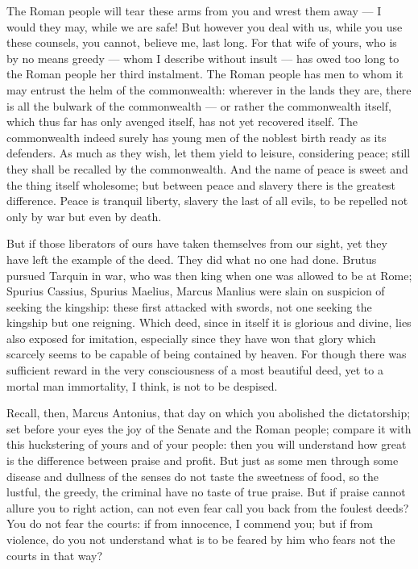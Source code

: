  The Roman people will tear these arms from you and wrest them away --- I would they may, while we are safe! But however you deal with us, while you use these counsels, you cannot, believe me, last long. For that wife of yours, who is by no means greedy --- whom I describe without insult --- has owed too long to the Roman people her third instalment. The Roman people has men to whom it may entrust the helm of the commonwealth: wherever in the lands they are, there is all the bulwark of the commonwealth --- or rather the commonwealth itself, which thus far has only avenged itself, has not yet recovered itself. The commonwealth indeed surely has young men of the noblest birth ready as its defenders. As much as they wish, let them yield to leisure, considering peace; still they shall be recalled by the commonwealth. And the name of peace is sweet and the thing itself wholesome; but between peace and slavery there is the greatest difference. Peace is tranquil liberty, slavery the last of all evils, to be repelled not only by war but even by death.

 But if those liberators of ours have taken themselves from our sight, yet they have left the example of the deed. They did what no one had done. Brutus pursued Tarquin in war, who was then king when one was allowed to be at Rome; Spurius Cassius, Spurius Maelius, Marcus Manlius were slain on suspicion of seeking the kingship: these first attacked with swords, not one seeking the kingship but one reigning. Which deed, since in itself it is glorious and divine, lies also exposed for imitation, especially since they have won that glory which scarcely seems to be capable of being contained by heaven. For though there was sufficient reward in the very consciousness of a most beautiful deed, yet to a mortal man immortality, I think, is not to be despised.

 Recall, then, Marcus Antonius, that day on which you abolished the dictatorship; set before your eyes the joy of the Senate and the Roman people; compare it with this huckstering of yours and of your people: then you will understand how great is the difference between praise and profit. But just as some men through some disease and dullness of the senses do not taste the sweetness of food, so the lustful, the greedy, the criminal have no taste of true praise. But if praise cannot allure you to right action, can not even fear call you back from the foulest deeds? You do not fear the courts: if from innocence, I commend you; but if from violence, do you not understand what is to be feared by him who fears not the courts in that way?

